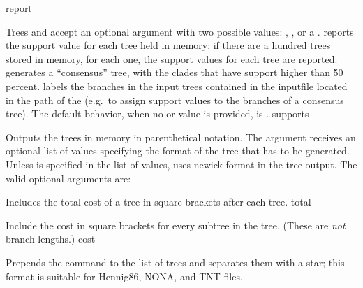 \begin{command}{report}{}
\begin{arguments}
\begin{argumentgroup}{Trees}
{                 and  accept an
                optional argument with two possible values:
                , , or a
                \poystring.
                reports the support value for each tree held in memory: if there
                are a hundred trees stored in memory, for each one, the support
                values for each tree are reported. 
                generates a ``consensus'' tree, with the clades that have
                support higher than 50 percent. \poystring labels the branches
                in the input trees contained in the inputfile located in the path of
                the \poystring (e.g.\ to assign support values to the branches of a consensus
                tree). The default behavior, when no
                 or  value is
                provided, is .}
                {supports}

                {Outputs the trees in memory in parenthetical notation. The argument
                 receives an optional list of values
                specifying the format of the tree that has to be generated.
                Unless  is specified in the list of values, 
                 uses newick format in the tree output. The
                valid optional arguments are:  
                
                \begin{description}
                        {Includes the total cost of a tree in square brackets after each tree.}
                        {total}

                        {Include the cost in square brackets for every subtree in the tree. (These 
                        are \emph{not} branch lengths.)}
                        {cost}

                        {Prepends the  command to the list of
                        trees and separates them with a star; this format is
                        suitable for Hennig86, NONA, and TNT files.}
                        {}
                        

\end{description}}
\end{argumentgroup}
\end{arguments}
\end{command}
